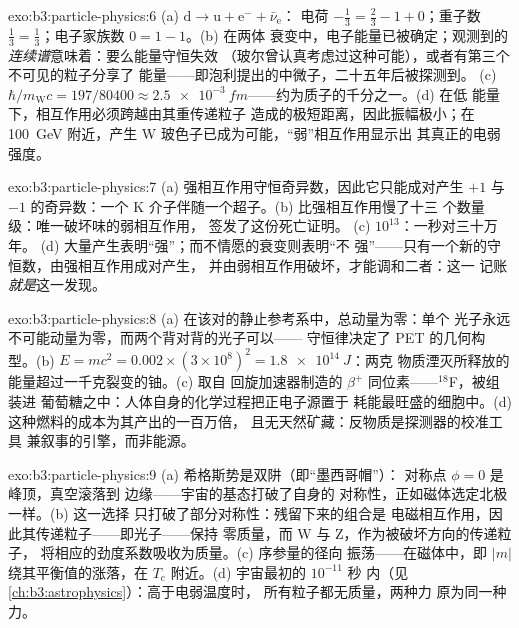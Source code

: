 \begin{solution}{exo:b3:particle-physics:6}
(a) $\text{d} \to \text{u} + \text{e}^- + \bar\nu_{\text{e}}$：
电荷 $-\tfrac13 = \tfrac23 - 1 + 0$；重子数
$\tfrac13 = \tfrac13$；电子家族数 $0 = 1 - 1$。(b) 在两体
衰变中，电子能量已被确定；观测到的
\emph{连续谱}意味着：要么能量守恒失效
（玻尔曾认真考虑过这种可能），或者有第三个不可见的粒子分享了
能量——即泡利提出的中微子，二十五年后被探测到。
(c) $\hbar/m_{\text{W}}c = 197/80400 \approx
\qty{2.5e-3}{fm}$——约为质子的千分之一。(d) 在低
能量下，相互作用必须跨越由其重传递粒子
造成的极短距离，因此振幅极小；在
\qty{100}{GeV} 附近，产生 W 玻色子已成为可能，“弱”相互作用显示出
其真正的电弱强度。
\end{solution}

\begin{solution}{exo:b3:particle-physics:7}
(a) 强相互作用守恒奇异数，因此它只能成对产生
$+1$ 与 $-1$ 的奇异数：一个 K 介子伴随一个超子。(b) 比强相互作用慢了十三
个数量级：唯一破坏味的弱相互作用，
签发了这份死亡证明。
(c) $10^{13}$：一秒对三十万年。
(d) 大量产生表明“强”；而不情愿的衰变则表明“不
强”——只有一个新的守恒数，由强相互作用成对产生，
并由弱相互作用破坏，才能调和二者：这一
记账\emph{就是}这一发现。
\end{solution}

\begin{solution}{exo:b3:particle-physics:8}
(a) 在该对的静止参考系中，总动量为零：单个
光子永远不可能动量为零，而两个背对背的光子可以——
守恒律决定了 PET 的几何构型。(b) $E = mc^2 =
0.002\times(3\times10^8)^2 = \qty{1.8e14}{J}$：两克
物质湮灭所释放的能量超过一千克裂变的铀。(c) 取自
回旋加速器制造的 $\beta^+$ 同位素——$^{18}$F，被组装进
葡萄糖之中：人体自身的化学过程把正电子源置于
耗能最旺盛的细胞中。(d) 这种燃料的成本为其产出的一百万倍，
且无天然矿藏：反物质是探测器的校准工具
兼叙事的引擎，而非能源。
\end{solution}

\begin{solution}{exo:b3:particle-physics:9}
(a) 希格斯势是双阱（即“墨西哥帽”）：
对称点 $\phi = 0$ 是峰顶，真空滚落到
边缘——宇宙的基态打破了自身的
对称性，正如磁体选定北极一样。(b) 这一选择
只打破了部分对称性：残留下来的组合是
电磁相互作用，因此其传递粒子——即光子——保持
零质量，而 W 与 Z，作为被破坏方向的传递粒子，
将相应的劲度系数吸收为质量。(c) 序参量的径向
振荡——在磁体中，即
$|m|$ 绕其平衡值的涨落，在
$T_{\text{c}}$ 附近。(d) 宇宙最初的 $10^{-11}$ 秒
内（见\cref{ch:b3:astrophysics}）：高于电弱温度时，
所有粒子都无质量，两种力
原为同一种力。
\end{solution}

